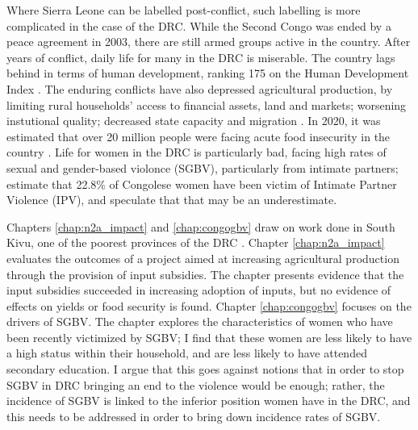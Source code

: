 Where Sierra Leone can be labelled post-conflict, such labelling is more complicated in the case of the DRC. While the Second Congo was ended by a peace agreement in 2003, there are still armed groups active in the country. After years of conflict, daily life for many in the DRC is miserable. The country lags behind in terms of human development, ranking 175 on the Human Development Index \citep{UNDP2020a}. The enduring conflicts have also depressed agricultural production, by limiting rural households' access to financial assets, land and markets; worsening instutional quality; decreased state capacity and migration  \citep{Lecoutere2005, Vlassenroot}. In 2020, it was estimated that over 20 million people were facing acute food insecurity in the country \citep{FAO2020}. Life for women in the DRC is particularly bad, facing high rates of sexual and gender-based violonce (SGBV), particularly from intimate partners; \cite{Peterman2011} estimate that 22.8\% of Congolese women have been victim of Intimate Partner Violence (IPV), and speculate that that may be an underestimate.

Chapters \ref{chap:n2a_impact} and \ref{chap:congogbv} draw on work done in South Kivu, one of the poorest provinces of the DRC \citep{Ansoms2009}. Chapter \ref{chap:n2a_impact} evaluates the outcomes of a project aimed at increasing agricultural production through the provision of input subsidies. The chapter presents evidence that the input subsidies succeeded in increasing adoption of inputs, but no evidence of effects on yields or food security is found. Chapter \ref{chap:congogbv} focuses on the drivers of SGBV. The chapter explores the characteristics of women who have been recently victimized by SGBV; I find that these women are less likely to have a high status within their household, and are less likely to have attended secondary education. I argue that this goes against notions that in order to stop SGBV in DRC bringing an end to the violence would be enough; rather, the incidence of SGBV is linked to the inferior position women have in the DRC, and this needs to be addressed in order to bring down incidence rates of SGBV.

